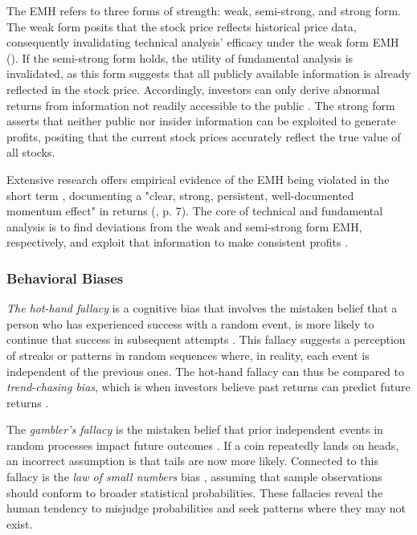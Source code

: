 The EMH refers to three forms of strength: weak, semi-strong, and strong form. The weak form posits that the stock price reflects historical price data, consequently invalidating technical analysis' efficacy under the weak form EMH (\cite{hudson1996note}). If the semi-strong form holds, the utility of fundamental analysis is invalidated, as this form suggests that all publicly available information is already reflected in the stock price. Accordingly, investors can only derive abnormal returns from information not readily accessible to the public \parencite{investopediaWeakStrong}. The strong form asserts that neither public nor insider information can be exploited to generate profits, positing that the current stock prices accurately reflect the true value of all stocks. 

Extensive research offers empirical evidence of the EMH being violated in the short term \parencite{naseer2015efficient}, documenting a "clear, strong, persistent, well-documented momentum effect" in returns (\cite{shefrin2007behavioral}, p. 7). The core of technical and fundamental analysis is to find deviations from the weak and semi-strong form EMH, respectively, and exploit that information to make consistent profits \parencite{teall2022financial}.

\subsubsection{Behavioral Biases}
\textit{The hot-hand fallacy} is a cognitive bias that involves the mistaken belief that a person who has experienced success with a random event, is more likely to continue that success in subsequent attempts \parencite{gilovich1985hot}. This fallacy suggests a perception of streaks or patterns in random sequences where, in reality, each event is independent of the previous ones. The hot-hand fallacy can thus be compared to \textit{trend-chasing bias}, which is when investors believe past returns can predict future returns \parencite{fong2014trend}. %

The \textit{gambler's fallacy} is the mistaken belief that prior independent events in random processes impact future outcomes \parencite{investopediaGamblersFallacy}. If a coin repeatedly lands on heads, an incorrect assumption is that tails are now more likely. Connected to this fallacy is the \textit{law of small numbers} bias \parencite{tversky1971belief}, assuming that sample observations should conform to broader statistical probabilities. These fallacies reveal the human tendency to misjudge probabilities and seek patterns where they may not exist. 

